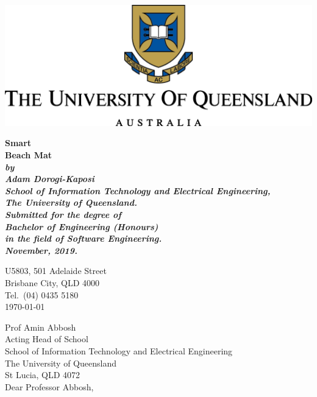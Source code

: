 \documentclass[12pt,openany,a4paper]{book}
\renewcommand{\baselinestretch}{1.2}	%
\begin{document}
\frontmatter

\begin{titlepage}
\renewcommand{\baselinestretch}{1.0}
\begin{center}
\centerline{\includegraphics{PNGLogo.png}}
\vspace*{35mm}
\Huge\bf
		Smart\\
		Beach Mat\\
\vspace{20mm}
\large\sl
		by\\
		Adam Dorogi-Kaposi
		\medskip\\
\rm
		School of Information Technology and Electrical Engineering,\\
		The University of Queensland.\\
\vspace{30mm}
		Submitted for the degree of\\
		Bachelor of Engineering (Honours)
		\smallskip\\
\normalsize
		in the field of Software Engineering.
		\medskip\\
\large
		November, 2019.
\end{center}
\end{titlepage}

\cleardoublepage

\begin{flushright}
	U5803, 501 Adelaide Street\\
	Brisbane City, QLD 4000\\
	Tel.\ (04) 0435 5180\\
	\medskip
	\today
\end{flushright}
\begin{flushleft}
  Prof Amin Abbosh\\
  Acting Head of School\\
  School of Information Technology and Electrical Engineering\\
  The University of Queensland\\
  St Lucia, QLD 4072\\
  \bigskip\bigskip
  Dear Professor Abbosh,
\end{flushleft}
\end{document}
